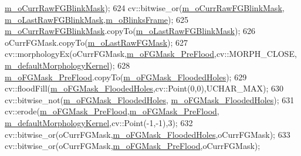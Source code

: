 \begin{DoxyCode}
      \mbox{\hyperlink{class_background_subtractor_su_b_s_e_n_s_e_a804b5ad0898777a2eb2cb4d932c857b6}{m\_oCurrRawFGBlinkMask}});
624     cv::bitwise\_or(\mbox{\hyperlink{class_background_subtractor_su_b_s_e_n_s_e_a804b5ad0898777a2eb2cb4d932c857b6}{m\_oCurrRawFGBlinkMask}},
      \mbox{\hyperlink{class_background_subtractor_su_b_s_e_n_s_e_aea0e3a3817d99da5b2fe15c810b0f428}{m\_oLastRawFGBlinkMask}},\mbox{\hyperlink{class_background_subtractor_su_b_s_e_n_s_e_a943b50c63d233c0948d82b64390f1aa1}{m\_oBlinksFrame}});
625     \mbox{\hyperlink{class_background_subtractor_su_b_s_e_n_s_e_a804b5ad0898777a2eb2cb4d932c857b6}{m\_oCurrRawFGBlinkMask}}.copyTo(\mbox{\hyperlink{class_background_subtractor_su_b_s_e_n_s_e_aea0e3a3817d99da5b2fe15c810b0f428}{m\_oLastRawFGBlinkMask}});
626     oCurrFGMask.copyTo(\mbox{\hyperlink{class_background_subtractor_su_b_s_e_n_s_e_a11c86236e9d141d711163c170a8bf0d6}{m\_oLastRawFGMask}});
627     cv::morphologyEx(oCurrFGMask,\mbox{\hyperlink{class_background_subtractor_su_b_s_e_n_s_e_a53ac4868e46e0ba382a0e6d769e8a961}{m\_oFGMask\_PreFlood}},cv::MORPH\_CLOSE, 
      \mbox{\hyperlink{class_background_subtractor_su_b_s_e_n_s_e_ae360b93378aa04b34aebc23b5f6e6714}{m\_defaultMorphologyKernel}});
628     \mbox{\hyperlink{class_background_subtractor_su_b_s_e_n_s_e_a53ac4868e46e0ba382a0e6d769e8a961}{m\_oFGMask\_PreFlood}}.copyTo(\mbox{\hyperlink{class_background_subtractor_su_b_s_e_n_s_e_a4a8df16fa54d4b22a9b787d5b57427f9}{m\_oFGMask\_FloodedHoles}});
629     cv::floodFill(\mbox{\hyperlink{class_background_subtractor_su_b_s_e_n_s_e_a4a8df16fa54d4b22a9b787d5b57427f9}{m\_oFGMask\_FloodedHoles}},cv::Point(0,0),UCHAR\_MAX);
630     cv::bitwise\_not(\mbox{\hyperlink{class_background_subtractor_su_b_s_e_n_s_e_a4a8df16fa54d4b22a9b787d5b57427f9}{m\_oFGMask\_FloodedHoles}},
      \mbox{\hyperlink{class_background_subtractor_su_b_s_e_n_s_e_a4a8df16fa54d4b22a9b787d5b57427f9}{m\_oFGMask\_FloodedHoles}});
631     cv::erode(\mbox{\hyperlink{class_background_subtractor_su_b_s_e_n_s_e_a53ac4868e46e0ba382a0e6d769e8a961}{m\_oFGMask\_PreFlood}},\mbox{\hyperlink{class_background_subtractor_su_b_s_e_n_s_e_a53ac4868e46e0ba382a0e6d769e8a961}{m\_oFGMask\_PreFlood}},
      \mbox{\hyperlink{class_background_subtractor_su_b_s_e_n_s_e_ae360b93378aa04b34aebc23b5f6e6714}{m\_defaultMorphologyKernel}},cv::Point(-1,-1),3);
632     cv::bitwise\_or(oCurrFGMask,\mbox{\hyperlink{class_background_subtractor_su_b_s_e_n_s_e_a4a8df16fa54d4b22a9b787d5b57427f9}{m\_oFGMask\_FloodedHoles}},oCurrFGMask);
633     cv::bitwise\_or(oCurrFGMask,\mbox{\hyperlink{class_background_subtractor_su_b_s_e_n_s_e_a53ac4868e46e0ba382a0e6d769e8a961}{m\_oFGMask\_PreFlood}},oCurrFGMask);

\end{DoxyCode}
